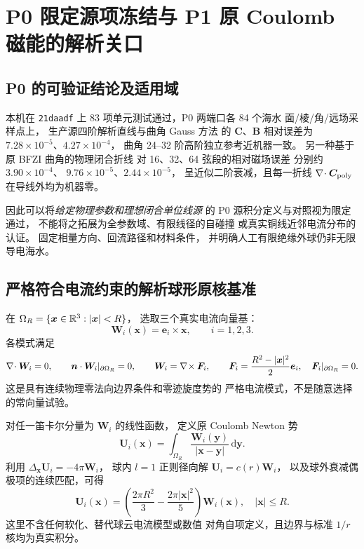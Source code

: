 \section{P0 限定源项冻结与 P1 原 Coulomb 磁能的解析关口}
\label{sec:p1-exact-coulomb-gate}

\subsection{P0 的可验证结论及适用域}
本机在 \texttt{21daadf} 上
83 项单元测试通过，P0 两端口各 84 个海水
面/棱/角/远场采样点上，
生产源四阶解析直线与曲角 Gauss 方法
的 $\bm C$、$\bm B$ 相对误差为
$7.28\times10^{-5}$、$4.27\times10^{-4}$，
曲角 24--32 阶高阶独立参考近机器一致。
另一种基于原 BFZI 曲角的物理闭合折线
对 16、32、64 弦段的相对磁场误差
分别约 $3.90\times10^{-4}$、
$9.76\times10^{-5}$、$2.44\times10^{-5}$，
呈近似二阶衰减，且每一折线
$\nabla\!\cdot\bm C_{\rm poly}$ 在导线外均为机器零。

因此可以将\emph{给定物理参数和理想闭合单位线源}
的 P0 源积分定义与对照视为限定通过，
不能将之拓展为全参数域、有限线径的自碰撞
或真实铜线近邻电流分布的认证。
固定相量方向、回流路径和材料条件，
并明确人工有限绝缘外球仍非无限导电海水。

\subsection{严格符合电流约束的解析球形原核基准}
在 $\Omega_R=\{\bm x\in\mathbb R^3:|\bm x|<R\}$，
选取三个真实电流向量基：
\[
\bm W_i(\bm x)=\bm e_i\times\bm x,\qquad i=1,2,3.
\]
各模式满足
\[
\nabla\!\cdot\bm W_i=0,\qquad
\bm n\cdot\bm W_i|_{\partial\Omega_R}=0,
\qquad
\bm W_i=\nabla\!\times\bm F_i,\qquad
\bm F_i=\frac{R^2-|\bm x|^2}{2}\bm e_i,
\quad
\bm F_i|_{\partial\Omega_R}=0 .
\]
这是具有连续物理零法向边界条件和零迹旋度势的
严格电流模式，不是随意选择的常向量试验。

对任一笛卡尔分量为 $\bm W_i$ 的线性函数，
定义原 Coulomb Newton 势
\[
\bm U_i(\bm x)
=\int_{\Omega_R}
\frac{\bm W_i(\bm y)}{|\bm x-\bm y|}\,
\mathrm d\bm y .
\]
利用 $\Delta_{\bm x}\bm U_i=-4\pi\bm W_i$，
球内 $l=1$ 正则径向解
$\bm U_i=c(r)\bm W_i$，
以及球外衰减偶极项的连续匹配，可得
\begin{equation}
\boxed{
\bm U_i(\bm x)
=\left(\frac{2\pi R^2}{3}
-\frac{2\pi|\bm x|^2}{5}\right)
\bm W_i(\bm x),\quad |\bm x|\le R .
}
\label{eq:p1-ball-exact-potential}
\end{equation}
这里不含任何软化、替代球云电流模型或数值
对角自项定义，且边界与标准 $1/r$ 核均为真实积分。

